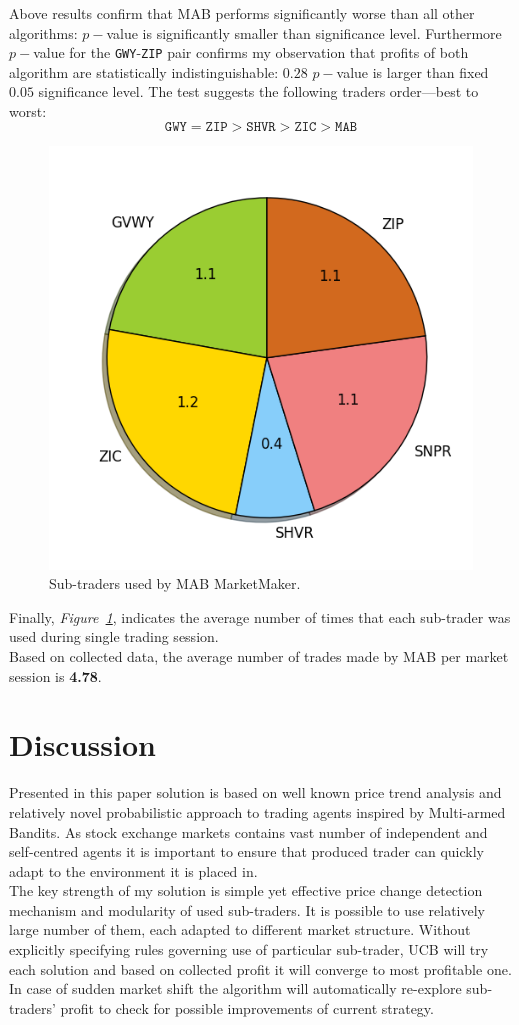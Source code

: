 \documentclass{llncs}
\begin{document}
Above results confirm that MAB performs significantly worse than all other algorithms: $p-$value is significantly smaller than significance level. Furthermore $p-$value for the \texttt{GWY}-\texttt{ZIP} pair confirms my observation that profits of both algorithm are statistically indistinguishable: $0.28$ $p-$value is larger than fixed $0.05$ significance level. The test suggests the following traders order---best to worst:\\
$$
\mathtt{GWY} = \mathtt{ZIP} > \mathtt{SHVR} > \mathtt{ZIC} > \mathtt{MAB}
$$

\begin{figure}[ht]
  \centering
  \includegraphics[width=.5\textwidth]{fig/pie.png}
  \caption{Sub-traders used by MAB MarketMaker.\label{fig:MABalgo}}
\end{figure}

Finally, \emph{Figure~\ref{fig:MABalgo}}, indicates the average number of times that each sub-trader was used during single trading session.\\
Based on collected data, the average number of trades made by MAB per market session is \textbf{4.78}.\\



\section{Discussion}
Presented in this paper solution is based on well known price trend analysis and relatively novel probabilistic approach to trading agents inspired by Multi-armed Bandits. As stock exchange markets contains vast number of independent and self-centred agents it is important to ensure that produced trader can quickly adapt to the environment it is placed in.\\
The key strength of my solution is simple yet effective price change detection mechanism and modularity of used sub-traders. It is possible to use relatively large number of them, each adapted to different market structure. Without explicitly specifying rules governing use of particular sub-trader, UCB will try each solution and based on collected profit it will converge to most profitable one. In case of sudden market shift the algorithm will automatically re-explore sub-traders' profit to check for possible improvements of current strategy.\\
\end{document}
